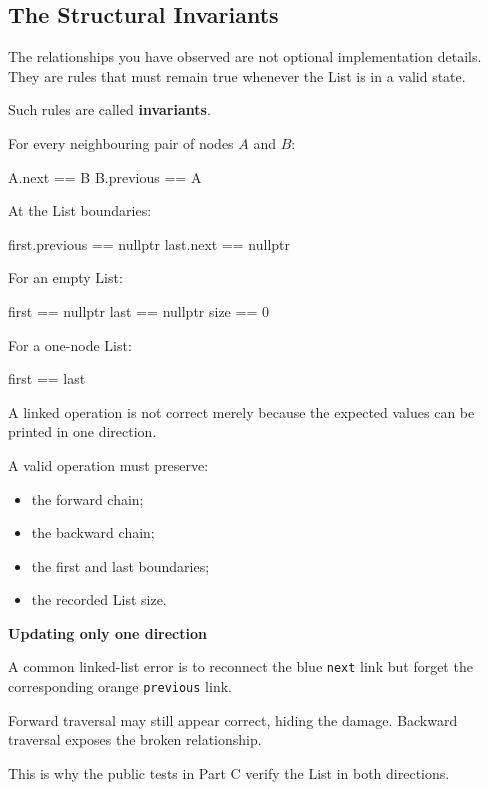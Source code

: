 \documentclass{csc2059practical}
\begin{document}
\subsection{The Structural Invariants}

The relationships you have observed are not optional implementation details. They are rules that must remain true whenever the List is in a valid state.

Such rules are called \textbf{invariants}.

For every neighbouring pair of nodes \(A\) and \(B\):

\begin{cppcode}
A.next == B
B.previous == A
\end{cppcode}

At the List boundaries:

\begin{cppcode}
first.previous == nullptr
last.next      == nullptr
\end{cppcode}

For an empty List:

\begin{cppcode}
first == nullptr
last  == nullptr
size  == 0
\end{cppcode}

For a one-node List:

\begin{cppcode}
first == last
\end{cppcode}

\begin{importantnote}
A linked operation is not correct merely because the expected values can be printed in one direction.

A valid operation must preserve:

\begin{itemize}
    \item the forward chain;
    \item the backward chain;
    \item the first and last boundaries;
    \item the recorded List size.
\end{itemize}
\end{importantnote}

\begin{commonerror}
\textbf{Updating only one direction}

A common linked-list error is to reconnect the blue \texttt{next} link but forget the corresponding orange \texttt{previous} link.

Forward traversal may still appear correct, hiding the damage. Backward traversal exposes the broken relationship.

This is why the public tests in Part C verify the List in both directions.
\end{commonerror}
\end{document}
